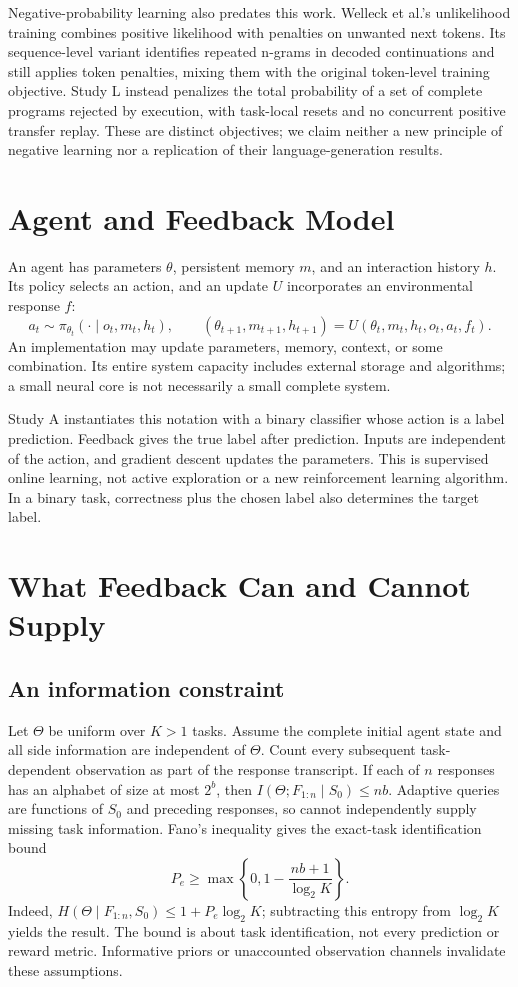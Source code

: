 \documentclass[11pt]{article}
\begin{document}
Negative-probability learning also predates this work. Welleck et al.'s
unlikelihood training \cite{unlikelihood} combines positive likelihood with
penalties on unwanted next tokens. Its sequence-level variant identifies
repeated n-grams in decoded continuations and still applies token penalties,
mixing them with the original token-level training objective. Study L instead
penalizes the total probability of a set of complete programs rejected by
execution, with task-local resets and no concurrent positive transfer replay.
These are distinct objectives; we claim neither a new principle of negative
learning nor a replication of their language-generation results.

\section{Agent and Feedback Model}
An agent has parameters $\theta$, persistent memory $m$, and an interaction
history $h$. Its policy selects an action, and an update $U$ incorporates an
environmental response $f$:
\[
 a_t\sim\pi_{\theta_t}(\cdot\mid o_t,m_t,h_t),\qquad
 (\theta_{t+1},m_{t+1},h_{t+1})=U(\theta_t,m_t,h_t,o_t,a_t,f_t).
\]
An implementation may update parameters, memory, context, or some combination.
Its entire system capacity includes external storage and algorithms; a small
neural core is not necessarily a small complete system.

Study A instantiates this notation with a binary classifier whose action is a
label prediction. Feedback gives the true label after prediction. Inputs are
independent of the action, and gradient descent updates the parameters. This
is supervised online learning, not active exploration or a new reinforcement
learning algorithm. In a binary task, correctness plus the chosen label also
determines the target label.

\section{What Feedback Can and Cannot Supply}
\subsection{An information constraint}
Let $\Theta$ be uniform over $K>1$ tasks. Assume the complete initial agent
state and all side information are independent of $\Theta$. Count every
subsequent task-dependent observation as part of the response transcript.
If each of $n$ responses has an alphabet of size at most $2^b$, then
$I(\Theta;F_{1:n}\mid S_0)\leq nb$. Adaptive queries are functions of
$S_0$ and preceding responses, so cannot independently supply missing task
information. Fano's inequality gives the exact-task identification bound
\[
 P_e\geq \max\left\{0,1-\frac{nb+1}{\log_2 K}\right\}.
\]
Indeed, $H(\Theta\mid F_{1:n},S_0)\leq 1+P_e\log_2 K$; subtracting
this entropy from $\log_2 K$ yields the result. The bound is about task
identification, not every prediction or reward metric. Informative priors or
unaccounted observation channels invalidate these assumptions.
\end{document}
